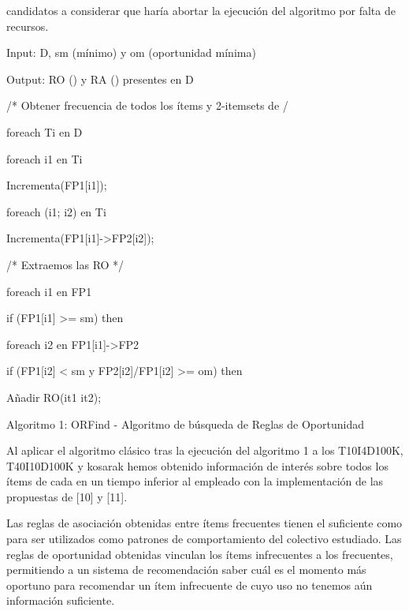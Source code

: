 
candidatos
a considerar que haría abortar la ejecución
del algoritmo por falta de recursos.

Input: D, sm (\soporte mínimo) y om (oportunidad mínima)

Output: RO (\ROPs) y RA (\ARs) presentes en D

/* Obtener frecuencia de todos los ítems y 2-itemsets de \D */

foreach \transaccion Ti en D

foreach i1 en Ti {

Incrementa(FP1[i1]);

foreach (i1; i2) en Ti

Incrementa(FP1[i1]->FP2[i2]);

}

/* Extraemos las RO */

foreach i1 en FP1

if (FP1[i1] >= sm) then

foreach i2 en FP1[i1]->FP2

if (FP1[i2] < sm y FP2[i2]/FP1[i2]
>= om) then

Añadir RO(it1  it2);

Algoritmo 1: ORFind - Algoritmo de búsqueda de
Reglas de Oportunidad

Al aplicar el algoritmo clásico tras la ejecución del
algoritmo 1 a los \datasets T10I4D100K,
T40I10D100K y kosarak hemos obtenido información
de interés sobre todos los ítems de cada \dataset
en un tiempo inferior al empleado con la
implementación de las propuestas de [10] y [11].

Las reglas de asociación obtenidas entre ítems
frecuentes tienen el suficiente \soporte como para
ser utilizados como patrones de comportamiento
del colectivo estudiado. Las reglas de oportunidad
obtenidas vinculan los ítems infrecuentes a los
frecuentes, permitiendo a un sistema de recomendación
saber cuál es el momento más oportuno
para recomendar un ítem infrecuente de cuyo uso
no tenemos aún información suficiente.